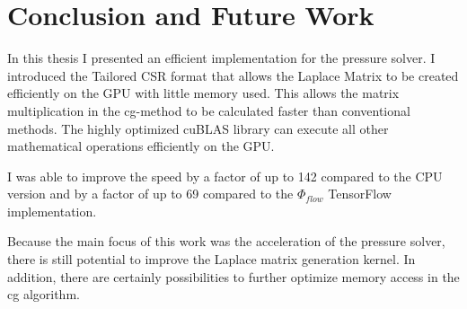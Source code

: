 
\chapter{Conclusion and Future Work}\label{chapter:conclusion}
In this thesis I presented an efficient implementation for the pressure solver. I introduced the Tailored CSR format that allows the Laplace Matrix to be created efficiently on the GPU with little memory used. This allows the matrix multiplication in the cg-method to be calculated faster than conventional methods. The highly optimized cuBLAS library can execute all other mathematical operations efficiently on the GPU.\\
\par I was able to improve the speed by a factor of up to 142 compared to the CPU version and by a factor of up to 69 compared to the $\Phi_{flow}$ TensorFlow implementation.\\
\par Because the main focus of this work was the acceleration of the pressure solver, there is still potential to improve the Laplace matrix generation kernel. In addition, there are certainly possibilities to further optimize memory access in the cg algorithm. 
